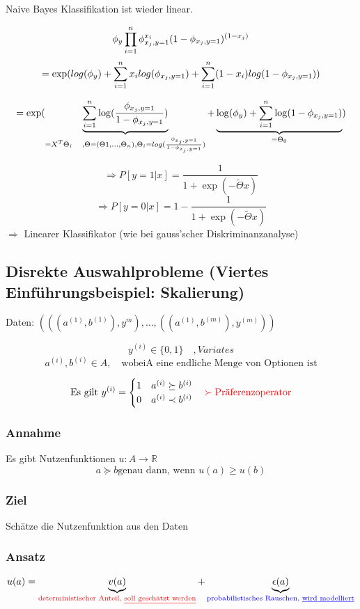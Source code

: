 		Naive Bayes Klassifikation ist wieder linear.
		
		\[ \phi_y \prod_{i = 1}^{n} \phi_{x_j, y=1}^{x_i} (1 - \phi_{x_j, y=1})^{(1 - x_j)}\]
		\[ = \exp(log(\phi_y) + \sum_{i = 1}^{n} x_i log(\phi_{x_j, y=1}) + \sum_{i = 1}^{n} (1-x_i) log(1 - \phi_{x_j, y=1})) \]

		\[ = \exp(\underbrace{\sum_{i = 1}^{n} \log(\frac{\phi_{x_j, y=1}}{1- \phi_{x_j, y=1}})}_{\substack{= X^T\Theta_i \quad, \Theta = (\Theta1,\dots,\Theta_n), \Theta_i = log(\frac{\phi_{x_j, y=1}}{1-\phi_{x_j, y=1}})}} + \underbrace{\log(\phi_y) + \sum_{i=1}^{n} \log(1 -\phi_{x_j, y=1})}_{\substack{=\Theta_0}})\]
		
		\[ \Rightarrow P[y = 1| x] = \frac{1}{1 + \exp(- \tilde{\Theta} x)} \]
		\[ \Rightarrow P[y = 0| x] = 1- \frac{1}{1 + \exp(- \tilde{\Theta} x)} \]
		$ \Rightarrow $ Linearer Klassifikator (wie bei gauss'scher Diskriminanzanalyse) 
		
	\subsection*{Disrekte Auswahlprobleme (Viertes Einführungsbeispiel: Skalierung)}
		Daten: $ (((a^{(1)}, b^{(1)}), y^{m}),\dots, ((a^{(1)}, b^{(m)}),y^{(m)})) $
		
		\[ y^{(i)} \in \{0,1\} \quad, Variates\]
		\[ a^{(i)}, b^{(i)} \in A,\quad \text{wobei} \text{A eine endliche Menge von Optionen ist}\]
		
		\[ \text{Es gilt } y^{(i)} =
		\begin{cases}1 & a^{(i)} \succeq b^{(i)}\\0 & a^{(i)} \prec b^{(i)}
		\end{cases} \quad \textcolor{red}{\succ \text{Präferenzoperator}}\]
		

		
	\subsubsection*{Annahme}
		Es gibt Nutzenfunktionen $ u : A \rightarrow \mathbb{R} $
		\[ a \succeq b \text{genau dann, wenn } u(a) \geq u(b) \]
	\subsubsection*{Ziel}
		Schätze die Nutzenfunktion aus den Daten
	\subsubsection*{Ansatz}
		\[ u(a) = \underbrace{v(a)}_{\textcolor{red}{\text{deterministischer Anteil, \underline{soll geschätzt werden}}}} + \underbrace{\epsilon(a)}_{\textcolor{blue}{\text{probabilistisches Rauschen, \underline{wird modelliert}}}}\]
		
